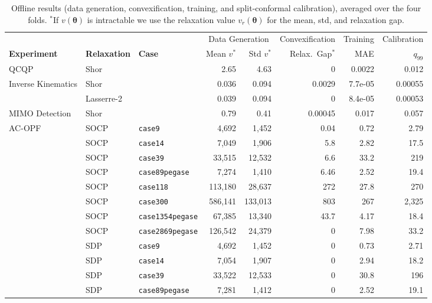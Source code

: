 \documentclass[10pt]{article} %
\theoremstyle{plain}
\theoremstyle{definition}
\theoremstyle{remark}
\begin{document}
\begin{table}[t]
\centering\footnotesize
\caption{Offline results (data generation, convexification, training, and split-conformal
calibration), averaged over the four folds. ${}^\ast$If $v(\bm{\theta})$ is intractable we
use the relaxation value $v_r(\bm{\theta})$ for the mean, std, and relaxation gap.}
\label{tab:offline}
\begin{tabular}{lll rr r r r}
\toprule
& & & \multicolumn{2}{c}{Data Generation} & Convexification & Training & Calibration \\
\cmidrule(lr){4-5}\cmidrule(lr){6-6}\cmidrule(lr){7-7}\cmidrule(lr){8-8}
\textbf{Experiment} & \textbf{Relaxation} & \textbf{Case} &
Mean $v^\ast$ & Std $v^\ast$ & Relax.\ Gap$^\ast$ & MAE & $q_{99}$ \\
\midrule
  \multirow{1}{*}{QCQP} & Shor &  & 2.65 & 4.63 & 0 & 0.0022 & 0.012 \\
\midrule
  \multirow{2}{*}{Inverse Kinematics} & Shor &  & 0.036 & 0.094 & 0.0029 & 7.7e-05 & 0.00055 \\
   & Lasserre-2 &  & 0.039 & 0.094 & 0 & 8.4e-05 & 0.00053 \\
\midrule
  \multirow{1}{*}{MIMO Detection} & Shor &  & 0.79 & 0.41 & 0.00045 & 0.017 & 0.057 \\
\midrule
  \multirow{15}{*}{AC-OPF} & SOCP & \texttt{case9} & 4,692 & 1,452 & 0.04 & 0.72 & 2.79 \\
   & SOCP & \texttt{case14} & 7,049 & 1,906 & 5.8 & 2.82 & 17.5 \\
   & SOCP & \texttt{case39} & 33,515 & 12,532 & 6.6 & 33.2 & 219 \\
   & SOCP & \texttt{case89pegase} & 7,274 & 1,410 & 6.46 & 2.52 & 19.4 \\
   & SOCP & \texttt{case118} & 113,180 & 28,637 & 272 & 27.8 & 270 \\
   & SOCP & \texttt{case300} & 586,141 & 133,013 & 803 & 267 & 2,325 \\
   & SOCP & \texttt{case1354pegase} & 67,385 & 13,340 & 43.7 & 4.17 & 18.4 \\
   & SOCP & \texttt{case2869pegase} & 126,542 & 24,379 & 0 & 7.98 & 33.2 \\
   & SDP & \texttt{case9} & 4,692 & 1,452 & 0 & 0.73 & 2.71 \\
   & SDP & \texttt{case14} & 7,054 & 1,907 & 0 & 2.94 & 18.2 \\
   & SDP & \texttt{case39} & 33,522 & 12,533 & 0 & 30.8 & 196 \\
   & SDP & \texttt{case89pegase} & 7,281 & 1,412 & 0 & 2.52 & 19.1 \\

\end{tabular}
\end{table}
\end{document}
